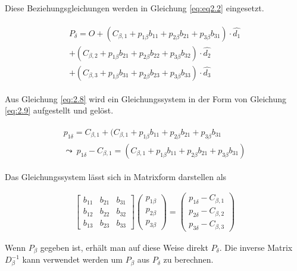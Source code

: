 Diese Beziehungsgleichungen werden in Gleichung \ref{eq:eq2.2} eingesetzt.

\begin{gather}
	\begin{split}
		P_\delta = O + (C_{\beta,1} + p_{1\beta}b_{11} +  p_{2\beta}b_{21} + p_{3\beta}b_{31}) \cdot \hat{d_1}\\
		+(C_{\beta,2} + p_{1\beta}b_{21} +  p_{2\beta}b_{22} + p_{3\beta}b_{32} )\cdot \hat{d_2}\\
		+ (C_{\beta,3} + p_{1\beta}b_{31} +  p_{2\beta}b_{23} + p_{3\beta}b_{33} )\cdot \hat{d_3}\label{eq:2.8}
	\end{split}
\end{gather}

Aus Gleichung \ref{eq:2.8} wird ein Gleichungssystem in der Form von Gleichung \ref{eq:2.9} aufgestellt und gelöst.

\begin{gather}
	\begin{split}
		p_{1\delta} = C_{\beta,1} + (C_{\beta,1} + p_{1\beta}b_{11} +  p_{2\beta}b_{21} + p_{3\beta}b_{31} \\
		\leadsto \: p_{1\delta} - C_{\beta,1} =  (C_{\beta,1} + p_{1\beta}b_{11} +  p_{2\beta}b_{21} + p_{3\beta}b_{31})\label{eq:2.9}
	\end{split}
\end{gather}

Das Gleichungssystem lässt sich in Matrixform darstellen als 

\begin{gather}
	\begin{bmatrix}b_{11} & b_{21} & b_{31}\\
		b_{12} & b_{22} & b_{32}\\
		b_{13} & b_{23} & b_{33}
	\end{bmatrix} 
	\begin{pmatrix}
		p_{1\beta}\\p_{2\beta}\\ p_{3\beta}
	\end{pmatrix} = 
	\begin{pmatrix}
		p_{1\delta} - C_{\beta,1}\\
		p_{2\delta} - C_{\beta,2}\\
		p_{3\delta} - C_{\beta,3}
	\end{pmatrix}
\end{gather}

Wenn $P_\beta$ gegeben ist, erhält man auf diese Weise direkt $P_\delta$. Die inverse Matrix $\ensuremath{D_\beta^{-1}}$ kann verwendet werden um  $P_\beta$ aus $P_\delta$ zu berechnen. 

